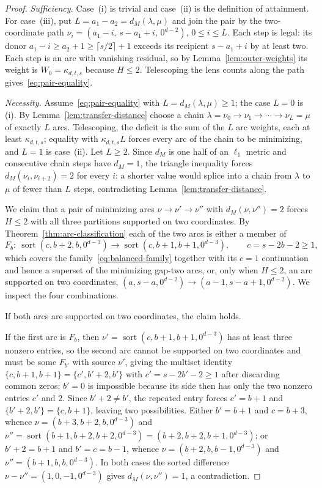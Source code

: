 \documentclass[pdflatex,sn-mathphys-num]{sn-jnl}
\theoremstyle{thmstyleone}
\theoremstyle{thmstylethree}
\theoremstyle{thmstyletwo}
\begin{document}
\begin{proof}
\emph{Sufficiency.}  Case~(i) is trivial and case~(ii) is the definition of
attainment.  For case~(iii), put $L=a_1-a_2=d_M(\lambda,\mu)$ and join the
pair by the two-coordinate path
$\nu_i=(a_1-i,\,s-a_1+i,\,0^{d-2})$, $0\le i\le L$.  Each step is legal:
its donor $a_1-i\ge a_2+1\ge\lceil s/2\rceil+1$ exceeds its recipient
$s-a_1+i$ by at least two.  Each step is an arc with vanishing residual, so
by Lemma~\ref{lem:outer-weights} its weight is $W_0=\kappa_{d,t,s}$
because $H\le2$.  Telescoping the lens counts along the path
gives~\eqref{eq:pair-equality}.

\emph{Necessity.}  Assume~\eqref{eq:pair-equality} with
$L=d_M(\lambda,\mu)\ge1$; the case $L=0$ is (i).  By
Lemma~\ref{lem:transfer-distance} choose a chain
$\lambda=\nu_0\to\nu_1\to\cdots\to\nu_L=\mu$ of exactly $L$ arcs.
Telescoping, the deficit is the sum of the $L$ arc weights, each at least
$\kappa_{d,t,s}$; equality with $\kappa_{d,t,s}L$ forces every arc of the
chain to be minimizing, and $L=1$ is case~(ii).  Let $L\ge2$.  Since
$d_M$ is one half of an $\ell_1$ metric and consecutive chain steps have
$d_M=1$, the triangle inequality forces $d_M(\nu_i,\nu_{i+2})=2$ for every
$i$: a shorter value would splice into a chain from $\lambda$ to $\mu$ of
fewer than $L$ steps, contradicting Lemma~\ref{lem:transfer-distance}.

We claim that a pair of minimizing arcs $\nu\to\nu'\to\nu''$ with
$d_M(\nu,\nu'')=2$ forces $H\le2$ with all three partitions supported on
two coordinates.  By Theorem~\ref{thm:arc-classification} each of the two
arcs is either a member of
\begin{equation}
 F_b:\ \operatorname{sort}(c,b+2,b,0^{d-3})\to
       \operatorname{sort}(c,b+1,b+1,0^{d-3}),
 \qquad c=s-2b-2\ge1,                              \label{eq:family-super}
\end{equation}
which covers the family~\eqref{eq:balanced-family} together with its $c=1$
continuation and hence a superset of the minimizing gap-two arcs, or, only
when $H\le2$, an arc supported on two coordinates,
$(a,s-a,0^{d-2})\to(a-1,s-a+1,0^{d-2})$.  We inspect the four
combinations.

If both arcs are supported on two coordinates, the claim holds.

If the first arc is $F_b$, then $\nu'=\operatorname{sort}(c,b+1,b+1,0^{d-3})$
has at least three nonzero entries, so the second arc cannot be supported
on two coordinates and must be some $F_{b'}$ with source $\nu'$, giving the
multiset identity $\{c,b+1,b+1\}=\{c',b'+2,b'\}$ with $c'=s-2b'-2\ge1$
after discarding common zeros; $b'=0$ is impossible because its side then
has only the two nonzero entries $c'$ and $2$.  Since $b'+2\ne b'$, the
repeated entry forces $c'=b+1$ and $\{b'+2,b'\}=\{c,b+1\}$, leaving two
possibilities.  Either $b'=b+1$ and $c=b+3$, whence
$\nu=(b+3,b+2,b,0^{d-3})$ and
$\nu''=\operatorname{sort}(b+1,b+2,b+2,0^{d-3})=(b+2,b+2,b+1,0^{d-3})$; or
$b'+2=b+1$ and $b'=c=b-1$, whence $\nu=(b+2,b,b-1,0^{d-3})$ and
$\nu''=(b+1,b,b,0^{d-3})$.  In both cases the sorted difference
$\nu-\nu''=(1,0,-1,0^{d-3})$ gives $d_M(\nu,\nu'')=1$, a contradiction.


\end{proof}
\end{document}
